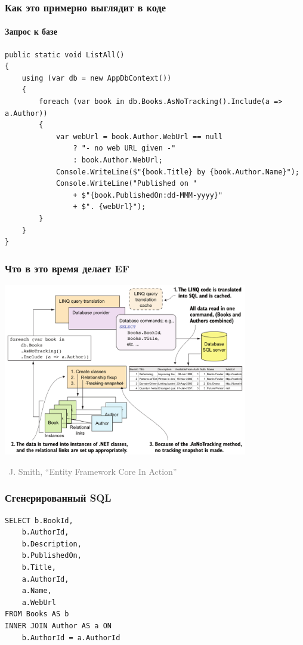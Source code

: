 \documentclass[xetex,mathserif,serif]{beamer}
\newcommand{\attribution}[1] {
\vspace{-5mm}\begin{flushright}\begin{scriptsize}\textcolor{gray}{\textcopyright\, #1}\end{scriptsize}\end{flushright}
}
\begin{document}
    \begin{frame}[fragile]
        \frametitle{Как это примерно выглядит в коде}
        \framesubtitle{Запрос к базе}
        \begin{footnotesize}
            \begin{verbatim}
public static void ListAll()
{
    using (var db = new AppDbContext())
    {
        foreach (var book in db.Books.AsNoTracking().Include(a => a.Author))
        {
            var webUrl = book.Author.WebUrl == null 
                ? "- no web URL given -" 
                : book.Author.WebUrl;
            Console.WriteLine($"{book.Title} by {book.Author.Name}");
            Console.WriteLine("Published on " 
                + $"{book.PublishedOn:dd-MMM-yyyy}" 
                + $". {webUrl}");
        }
    }
}
            \end{verbatim}
        \end{footnotesize}
    \end{frame}

    \begin{frame}
        \frametitle{Что в это время делает EF}
        \begin{center}
            \includegraphics[width=0.8\textwidth]{efCoreQuery.png}
            \attribution{J. Smith, ``Entity Framework Core In Action''}
        \end{center}
    \end{frame}

    \begin{frame}[fragile]
        \frametitle{Сгенерированный SQL}
        \begin{verbatim}
SELECT b.BookId,
    b.AuthorId,
    b.Description,
    b.PublishedOn,
    b.Title,
    a.AuthorId,
    a.Name,
    a.WebUrl
FROM Books AS b
INNER JOIN Author AS a ON
    b.AuthorId = a.AuthorId
        \end{verbatim}
    \end{frame}
\end{document}
